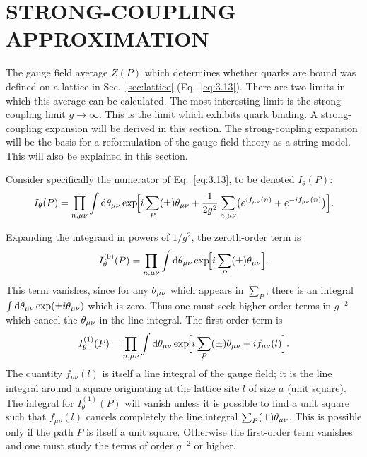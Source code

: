 \section{STRONG-COUPLING APPROXIMATION}\label{sec:strong}

The gauge field average $Z(P)$ which determines whether quarks are bound
was defined on a lattice in Sec.~\ref{sec:lattice}
(Eq.~\eqref{eq:3.13}).  There are two limits in which this average can
be calculated.  The most interesting limit is the strong-coupling limit
$g \to \infty$.  This is the limit which exhibits quark binding.  A
strong-coupling expansion will be derived in this section.  The
strong-coupling expansion will be the basis for a reformulation of the
gauge-field theory as a string model.  This will also be explained in
this section.

Consider specifically the numerator of Eq.~\eqref{eq:3.13}, to be
denoted $I_{\theta}(P)$:
\begin{equation}
I_{\theta}(P) = \prod_{n,\mu\nu}\int\mathrm{d}\theta_{\mu\nu}
  \exp\!\Bigl[i\sum_{P}(\pm)\theta_{\mu\nu}
    +\frac{1}{2g^{2}}\sum_{n,\mu\nu}
      \bigl(e^{if_{\mu\nu}(n)}+e^{-if_{\mu\nu}(n)}\bigr)\Bigr].
\label{eq:4.1}
\end{equation}

Expanding the integrand in powers of $1/g^{2}$, the zeroth-order term is
\begin{equation}
I_{\theta}^{(0)}(P) = \prod_{n,\mu\nu}\int\mathrm{d}\theta_{\mu\nu}
  \exp\!\Bigl[i\sum_{P}(\pm)\theta_{\mu\nu}\Bigr].
\label{eq:4.2}
\end{equation}
This term vanishes, since for any $\theta_{\mu\nu}$ which appears in
$\sum_{P}$, there is an integral
$\int\mathrm{d}\theta_{\mu\nu}\exp(\pm i\theta_{\mu\nu})$ which is zero.  Thus one must
seek higher-order terms in $g^{-2}$ which cancel the $\theta_{\mu\nu}$ in
the line integral.  The first-order term is
\begin{equation}
I_{\theta}^{(1)}(P) = \prod_{n,\mu\nu}\int\mathrm{d}\theta_{\mu\nu}
  \exp\!\Bigl[i\sum_{P}(\pm)\theta_{\mu\nu}+if_{\mu\nu}(l)\Bigr].
\label{eq:4.3}
\end{equation}
The quantity $f_{\mu\nu}(l)$ is itself a line integral of the gauge
field; it is the line integral around a square originating at the lattice
site $l$ of size $a$ (unit square).  The integral for $I_{\theta}^{(1)}(P)$
will vanish unless it is possible to find a unit square such that
$f_{\mu\nu}(l)$ cancels completely the line integral
$\sum_{P}(\pm)\theta_{\mu\nu}$.  This is possible only if the path $P$ is
itself a unit square.  Otherwise the first-order term vanishes and one
must study the terms of order $g^{-2}$ or higher.

